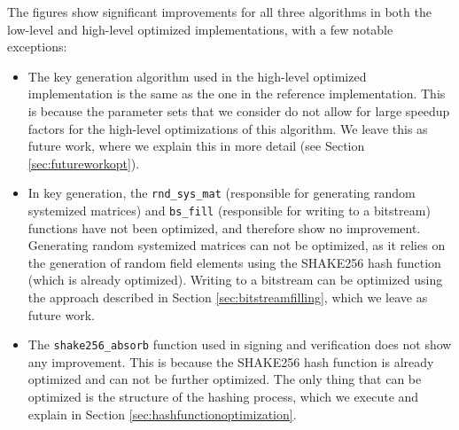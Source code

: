 \documentclass[11pt,a4paper]{report}
\theoremstyle{definition}
\begin{document}
The figures show significant improvements for all three algorithms in both the low-level and high-level optimized implementations, with a few notable exceptions:
\begin{itemize}
  \item The key generation algorithm used in the high-level optimized implementation is the same as the one in the reference implementation. This is because the parameter sets that we consider do not allow for large speedup factors for the high-level optimizations of this algorithm. We leave this as future work, where we explain this in more detail (see Section \ref{sec:futureworkopt}).
  \item In key generation, the \texttt{rnd\_sys\_mat} (responsible for generating random systemized matrices) and \texttt{bs\_fill} (responsible for writing to a bitstream) functions have not been optimized, and therefore show no improvement. Generating random systemized matrices can not be optimized, as it relies on the generation of random field elements using the SHAKE256 hash function (which is already optimized). Writing to a bitstream can be optimized using the approach described in Section \ref{sec:bitstreamfilling}, which we leave as future work.
  \item The \texttt{shake256\_absorb} function used in signing and verification does not show any improvement. This is because the SHAKE256 hash function is already optimized and can not be further optimized. The only thing that can be optimized is the structure of the hashing process, which we execute and explain in Section \ref{sec:hashfunctionoptimization}.
\end{itemize}
\end{document}
